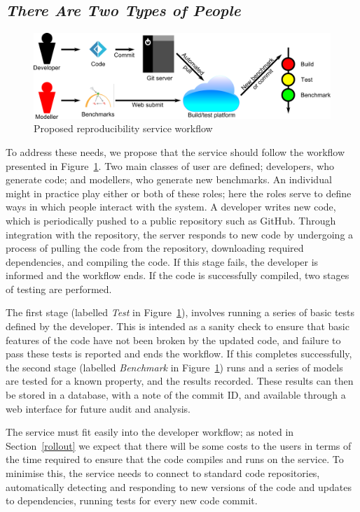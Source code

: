 \documentclass[conference]{IEEEtran}
\begin{document}
\subsection{{\emph{There Are Two Types of People}}}

\begin{figure}[!htp]
	\centering
	\includegraphics[width=\textwidth]{workflow}
	\caption{Proposed reproducibility service workflow}
	\label{schematic}
\end{figure}

To address these needs, we propose that the service should follow the
workflow presented in Figure~\ref{schematic}. Two main classes of user are
defined; developers, who generate code; and modellers, who generate
new benchmarks. An individual might in practice play either or both of
these roles; here the roles serve to define ways in which people
interact with the system. A developer writes new code, which is
periodically pushed to a public repository such as GitHub. Through
integration with the repository, the server responds to new code by
undergoing a process of pulling the code from the repository,
downloading required dependencies, and compiling the code. If this
stage fails, the developer is informed and the workflow ends. If the
code is successfully compiled, two stages of testing are
performed.

The first stage (labelled {\emph{Test}} in Figure~\ref{schematic}),
involves running a series of basic tests defined by the
developer. This is intended as a sanity check to ensure that basic
features of the code have not been broken by the updated code, and
failure to pass these tests is reported and ends the workflow. If this
completes successfully, the second stage (labelled {\emph{Benchmark}}
in Figure~\ref{schematic}) runs and a series of models are tested for
a known property, and the results recorded. These results can then be
stored in a database, with a note of the commit ID, and available
through a web interface for future audit and analysis.

The service must fit easily into the developer workflow; as noted in
Section~\ref{rollout} we expect that there will be some costs to the
users in terms of the time required to ensure that the code compiles
and runs on the service. To minimise this, the service needs to
connect to standard code repositories, automatically detecting and
responding to new versions of the code and updates to dependencies,
running tests for every new code commit.
\end{document}
